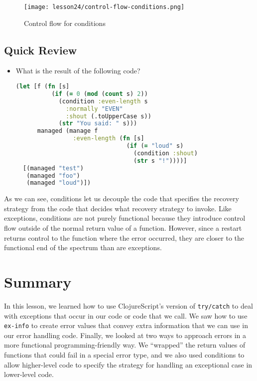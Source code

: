 \documentclass[10pt,twoside,openright]{memoir}
\begin{document}
\begin{figure}[H]
\caption{Control flow for conditions}
\centering
\texttt{[image: lesson24/control-flow-conditions.png]}
\end{figure}


\subsection{Quick Review}

\begin{itemize}
\tightlist
\item What is the result of the following code?
\begin{lstlisting}[language=Clojure]
(let [f (fn [s]
          (if (= 0 (mod (count s) 2))
            (condition :even-length s
              :normally "EVEN"
              :shout (.toUpperCase s))
            (str "You said: " s)))
      managed (manage f
                :even-length (fn [s]
                               (if (= "loud" s)
                                 (condition :shout)
                                 (str s "!"))))]
  [(managed "test")
   (managed "foo")
   (managed "loud")])
\end{lstlisting}
\end{itemize}


As we can see, conditions let us decouple the code that specifies the
recovery strategy from the code that decides what recovery strategy to
invoke. Like exceptions, conditions are not purely functional because
they introduce control flow outside of the normal return value of a
function. However, since a restart returns control to the function where
the error occurred, they are closer to the functional end of the
spectrum than are exceptions.


\section{Summary}

In this lesson, we learned how to use ClojureScript's version of
\texttt{try/catch} to deal with exceptions that occur in our code or
code that we call. We saw how to use \texttt{ex-info} to create error
values that convey extra information that we can use in our error
handling code. Finally, we looked at two ways to approach errors in a
more functional programming-friendly way. We ``wrapped'' the return
values of functions that could fail in a special error type, and we also
used conditions to allow higher-level code to specify the strategy for
handling an exceptional case in lower-level code.
\end{document}
